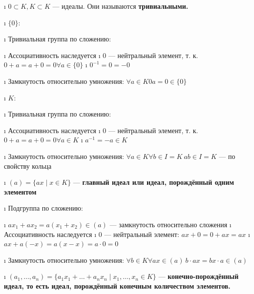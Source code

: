 \begin{solution}

\begin{enumerate}
\def\labelenumi{\alph{enumi})}
\tightlist
\i
  \(0 \subset K, K \subset K\) --- идеалы. Они называются \bf{тривиальными}.

  \begin{itemize}
  \tightlist
  \i
    \(\{0\}\):

    \begin{enumerate}
    \def\labelenumii{\arabic{enumii}.}
    \tightlist
    \i
      Тривиальная группа по сложению:

      \begin{itemize}
      \tightlist
      \i
        Ассоциативность наследуется
      \i
        \(0\) --- нейтральный элемент, т. к. \(0+a=a+0=0 \forall a \in \{0\}\)
      \i
        \(0^{-1} = 0 = -0\)
      \end{itemize}
    \i
      Замкнутость относительно умножения:
      \(\forall a \in K 0a=0 \in \{0\}\)
    \end{enumerate}
  \i
    \(K\):

    \begin{enumerate}
    \def\labelenumii{\arabic{enumii}.}
    \tightlist
    \i
      Тривиальная группа по сложению:

      \begin{itemize}
      \tightlist
      \i
        Ассоциативность наследуется
      \i
        \(0\) --- нейтральный элемент, т. к. \(0+a=a+0=0 \forall a \in K\)
      \i
        \(a^{-1} = -a \in K\)
      \end{itemize}
    \i
      Замкнутость относительно умножения:
      \(\forall a \in K \forall b \in I=K \ ab \in I=K\) --- по свойству кольца
    \end{enumerate}
  \end{itemize}
\i
  \((a) = \{ax \mid x\in K\}\) --- \bf{главный идеал} или \bf{идеал, порождённый одним элементом}

  \begin{enumerate}
  \def\labelenumii{\arabic{enumii}.}
  \tightlist
  \i
    Подгруппа по сложению:

    \begin{itemize}
    \tightlist
    \i
      \(ax_1+ax_2=a(x_1+x_2)\in(a)\) --- замкнутость относительно сложения
    \i
      Ассоциативность наследуется
    \i
      \(0\) --- нейтральный элемент: \(ax+0=0+ax=ax\)
    \i
      \(ax+a(-x)=a(x-x)=a\cdot 0=0\)
    \end{itemize}
  \i
    Замкнутость относительно умножения:
    \(\forall b \in K \forall ax \in (a) \ b\cdot ax = bx \cdot a \in (a)\)
  \end{enumerate}
\i
  \((a_1,\ldots,a_n) = \{a_1x_1+\ldots+a_nx_n \mid x_1,\ldots,x_n \in K\}\) --- \bf{конечно-порождённый идеал}, то есть идеал, порождённый конечным количеством элементов.


\end{enumerate}
\end{solution}
